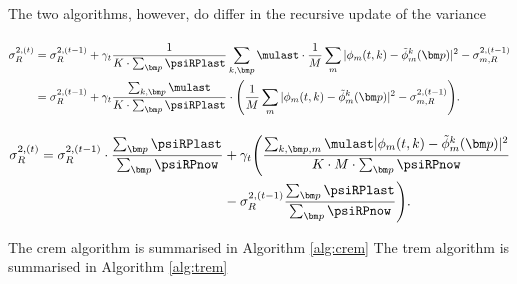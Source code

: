 The two algorithms, however, do differ in the recursive update of the variance

\paragraph{}
\begin{align}
\label{eq:trem-var}
    \sigma_R^{2,(t)} &= \sigma_R^{2,(t-1)}+\gamma_t\frac{1}{K\*\sum_{\bm p}\psiRPlast} \sum_{k,\bm p}\mulast\*\frac{1}{M}\sum_{m}|\phi_m(t,k)-\tilde\phi_m^k(\bm p)|^2-\sigma_{m,R}^{2,(t-1)}\\
                     &= \sigma_R^{2,(t-1)}+\gamma_t\frac{\sum_{k,\bm p}\mulast}{K\*\sum_{\bm p}\psiRPlast} \*\Bigg ( \frac{1}{M}\sum_{m}|\phi_m(t,k)-\tilde\phi_m^k(\bm p)|^2-\sigma_{m,R}^{2,(t-1)}\Bigg ).
\end{align}

\paragraph{}
\begin{align}
\label{eq:crem-var}
    \sigma_R^{2,(t)} = \sigma_R^{2,(t-1)}\cdot\frac{\sum_{\bm p}\psiRPlast}{\sum_{\bm p}\psiRPnow}&+\gamma_t\Bigg ( \frac{\sum_{k,\bm p,m}\mulast|\phi_m(t,k)-\tilde\phi_m^k(\bm p)|^2}{K \* M \* \sum_{\bm p}\psiRPnow}\\
    &-\sigma_R^{2,(t-1)}\frac{\sum_{\bm p}\psiRPlast}{\sum_{\bm p}\psiRPnow} \Bigg ).
\end{align}

The \gls{crem} algorithm is summarised in Algorithm \ref{alg:crem}
The \gls{trem} algorithm is summarised in Algorithm \ref{alg:trem}





